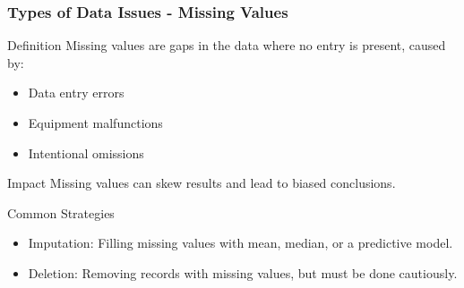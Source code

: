 \documentclass{beamer}
\begin{document}
\begin{frame}[fragile]
    \frametitle{Types of Data Issues - Missing Values}
    \begin{block}{Definition}
        Missing values are gaps in the data where no entry is present, caused by:
    \end{block}
    \begin{itemize}
        \item Data entry errors
        \item Equipment malfunctions
        \item Intentional omissions
    \end{itemize}
    \begin{block}{Impact}
        Missing values can skew results and lead to biased conclusions.
    \end{block}
    \begin{block}{Common Strategies}
        \begin{itemize}
            \item Imputation: Filling missing values with mean, median, or a predictive model.
            \item Deletion: Removing records with missing values, but must be done cautiously.
        \end{itemize}
    \end{block}
\end{frame}
\end{document}
